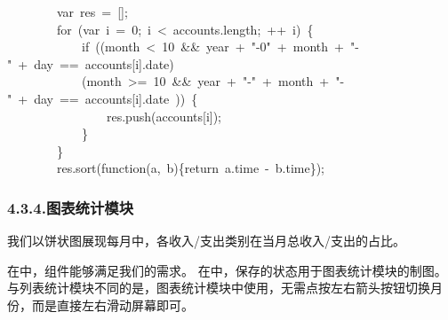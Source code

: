 \documentclass{article}
\begin{document}
\begin{mdpre}%
\noindent~~~~~~~~{var}~res~=~{}[];\\
~~~~~~~~{for}~({var}~i~=~{0};~i~\textless{}~accounts.length;~++~i)~\{\\
~~~~~~~~~~~~{if}~((month~\textless{}~{10}~\&\&~year~+~{"}{-0}{"}~+~month~+~{"}{-}{"}~+~day~==~accounts{}[i].date)~\textbar{}\textbar{}\\
~~~~~~~~~~~~(month~\textgreater{}=~{10}~\&\&~year~+~{"}{-}{"}~+~month~+~{"}{-}{"}~+~day~==~accounts{}[i].date~))~\{\\
~~~~~~~~~~~~~~~~res.push(accounts{}[i]);\\
~~~~~~~~~~~~\}\\
~~~~~~~~\}\\
~~~~~~~~res.sort({function}(a,~b)\{{return}~a.time~-~b.time\});%
\end{mdpre}
\subsubsection{4.3.4.\hspace*{0.5em}图表统计模块}\label{section}%

\noindent{}我们以饼状图展现每月中，各收入/支出类别在当月总收入/支出的占比。%

在中，组件能够满足我们的需求。
在中，保存的状态用于图表统计模块的制图。
与列表统计模块不同的是，图表统计模块中使用，无需点按左右箭头按钮切换月份，而是直接左右滑动屏幕即可。%
\end{document}
